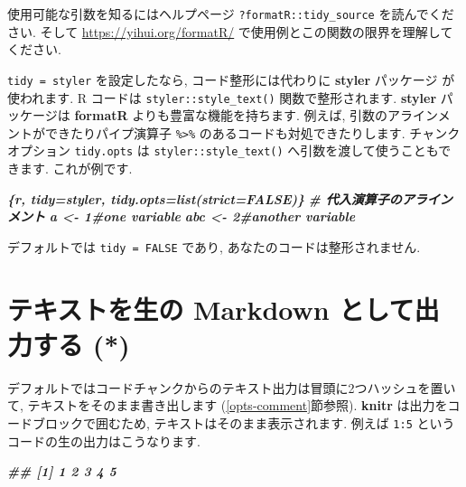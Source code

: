 \documentclass[
  11pt,
  lualatex,
  ja=standard]{bxjsreport}
\newenvironment{Shaded}{\begin{snugshade}}{\end{snugshade}}
\newcommand{\InformationTok}[1]{\textcolor[rgb]{0.56,0.35,0.01}{\textbf{\textit{#1}}}}
\begin{document}
使用可能な引数を知るにはヘルプページ \texttt{?formatR::tidy\_source} を読んでください. そして \url{https://yihui.org/formatR/} で使用例とこの関数の限界を理解してください.

\texttt{tidy = styler} を設定したなら, コード整形には代わりに \textbf{styler} パッケージ \autocite{R-styler} が使われます. R コードは \texttt{styler::style\_text()} 関数で整形されます. \textbf{styler} パッケージは \textbf{formatR} よりも豊富な機能を持ちます. 例えば, 引数のアラインメントができたりパイプ演算子 \texttt{\%\textgreater{}\%} のあるコードも対処できたりします. チャンクオプション \texttt{tidy.opts} は \texttt{styler::style\_text()} へ引数を渡して使うこともできます. これが例です.

\begin{Shaded}
\begin{Highlighting}[]
\InformationTok{\textasciigrave{}\textasciigrave{}\textasciigrave{}\{r, tidy=\textquotesingle{}styler\textquotesingle{}, tidy.opts=list(strict=FALSE)\}}
\InformationTok{\# 代入演算子のアラインメント}
\InformationTok{a   \textless{}{-} 1\#one variable}
\InformationTok{abc \textless{}{-} 2\#another variable}
\InformationTok{\textasciigrave{}\textasciigrave{}\textasciigrave{}}
\end{Highlighting}
\end{Shaded}

デフォルトでは \texttt{tidy = FALSE} であり, あなたのコードは整形されません.

\hypertarget{results-asis}{%
\section{テキストを生の Markdown として出力する (*)}\label{results-asis}}

デフォルトではコードチャンクからのテキスト出力は冒頭に2つハッシュを置いて, テキストをそのまま書き出します (\ref{opts-comment}節参照). \textbf{knitr} は出力をコードブロックで囲むため, テキストはそのまま表示されます. 例えば \texttt{1:5} というコードの生の出力はこうなります.

\begin{Shaded}
\begin{Highlighting}[]
\InformationTok{\textasciigrave{}\textasciigrave{}\textasciigrave{}}
\InformationTok{\#\# [1] 1 2 3 4 5}
\InformationTok{\textasciigrave{}\textasciigrave{}\textasciigrave{}}
\end{Highlighting}
\end{Shaded}
\end{document}

